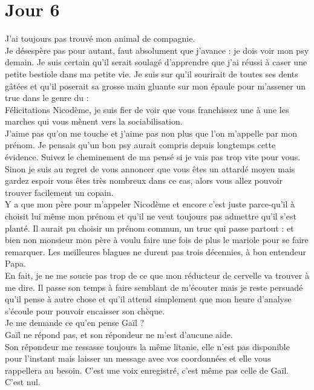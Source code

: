 \chapter*{Jour 6}
J'ai toujours pas trouvé mon animal de compagnie. \\

Je désespère pas pour autant, faut absolument que j'avance : je dois voir mon psy demain. Je suis certain qu'il serait soulagé d'apprendre que j'ai réussi à caser une petite bestiole dans ma petite vie. Je suis sur qu'il sourirait de toutes ses dents gâtées et qu'il poserait sa grosse main gluante sur mon épaule pour m'assener un truc dans le genre du : \\
Félicitations Nicodème, je suis fier de voir que vous franchissez une à une les marches qui vous mènent vers la sociabilisation.\\

J'aime pas qu'on me touche et j'aime pas non plus que l'on m'appelle par mon prénom. Je pensais qu'un bon psy aurait compris depuis longtemps cette évidence. Suivez le cheminement de ma pensé si je vais pas trop vite pour vous. Sinon je suis au regret de vous annoncer que vous êtes un attardé moyen mais gardez espoir vous êtes très nombreux dans ce cas, alors vous allez pouvoir trouver facilement un copain.\\

Y a que mon père pour m'appeler Nicodème et encore c'est juste parce-qu'il à choisit lui même mon prénom et qu'il ne veut toujours pas admettre qu'il s'est planté. Il aurait pu choisir un prénom commun, un truc qui passe partout : et bien non monsieur mon père à voulu faire une fois de plus le mariole pour se faire remarquer. Les meilleures blagues ne durent pas trois décennies, à bon entendeur Papa.\\

En fait, je ne me soucie pas trop de ce que mon réducteur de cervelle va trouver à me dire. Il passe son temps à faire semblant de m'écouter mais je reste persuadé qu'il pense à autre chose et qu'il attend simplement que mon heure d'analyse s'écoule pour pouvoir encaisser son chèque. \\

Je me demande ce qu'en pense Gaïl ? \\
Gaïl ne répond pas, et son répondeur ne m'est d'aucune aide. \\
Son répondeur me ressasse toujours la même litanie, elle n'est pas disponible pour l'instant mais laisser un message avec vos coordonnées et elle vous rappellera au besoin. C'est une voix enregistré, c'est même pas celle de Gaïl. C'est nul. \\

